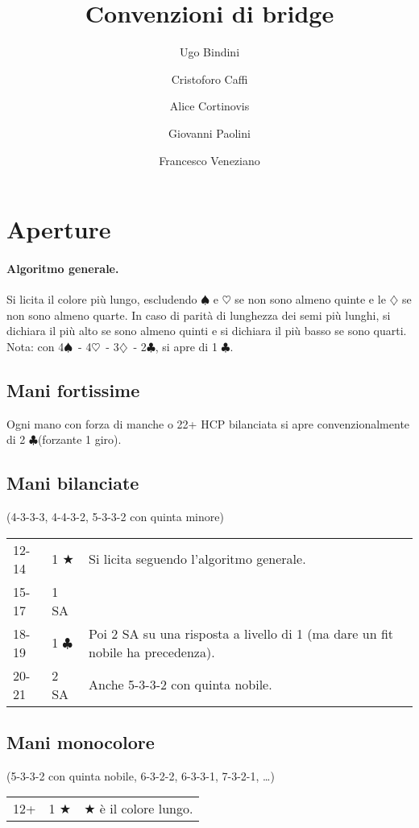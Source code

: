 \documentclass[a4paper,10pt]{article}
\title{Convenzioni di bridge}
\author{Ugo Bindini \and Cristoforo Caffi \and Alice Cortinovis \and Giovanni Paolini \and Francesco Veneziano}
\renewcommand{\c}{$\clubsuit$\xspace}
\renewcommand{\d}{$\diamondsuit$\xspace}
\newcommand{\h}{$\heartsuit$\xspace}
\newcommand{\s}{$\spadesuit$\xspace}
\renewcommand{\j}{$\bigstar$\xspace}
\newcommand{\sa}{SA\xspace}
\newcommand{\smallspace}{\vskip0.3cm}
\newenvironment{threecol}
  {\smallspace\noindent\begin{tabular}{l l p{0.78\textwidth}}}
  {\end{tabular}\smallspace}
\begin{document}
\maketitle

\tableofcontents

\pagebreak
\section{Aperture}

\paragraph{Algoritmo generale.}
Si licita il colore più lungo, escludendo \s e \h se non sono almeno quinte e le \d se non sono almeno quarte.
In caso di parità di lunghezza dei semi più lunghi, si dichiara il più alto se sono almeno quinti e si dichiara il più basso se sono quarti.
Nota: con 4\s\ - 4\h\ - 3\d\ - 2\c, si apre di 1 \c.

\subsection{Mani fortissime}

Ogni mano con forza di manche o 22+ HCP bilanciata si apre convenzionalmente di 2 \c (forzante 1 giro).

\subsection{Mani bilanciate}
(4-3-3-3, 4-4-3-2, 5-3-3-2 con quinta minore)
\smallspace

\begin{threecol}
 12-14 & 1 \j & Si licita seguendo l'algoritmo generale. \\
 15-17 & 1 \sa & \\
 18-19 & 1 \c & Poi 2 \sa su una risposta a livello di 1 (ma dare un fit nobile ha precedenza). \\
 20-21 & 2 \sa & Anche 5-3-3-2 con quinta nobile.
\end{threecol}


\subsection{Mani monocolore}
(5-3-3-2 con quinta nobile, 6-3-2-2, 6-3-3-1, 7-3-2-1, \dots)

\begin{threecol}
 12+ & 1 \j & \j è il colore lungo.
\end{threecol}
\end{document}
